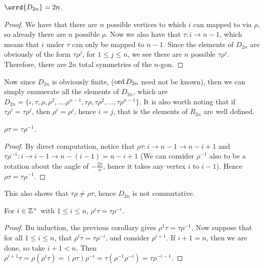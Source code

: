 \begin{corollary}
    $\orrd{D_{2n}}=2n$.
\end{corollary}
\begin{proof}
    We have that there are $n$ possible vertices to which  $i$ can mapped to via  $\rho$, so already
    there are  $n$ possible  $\rho$. Now we also have that  $\tau:i \rightarrow n-1$, which means
    that $i$ under $\tau$ can only be mapped to $n-1$. Since the elements of $D_{2n}$ are obviously
    of the form $\tau\rho^j$, for  $1 \leq j \leq n$, we see there are  $n$ possible  $\tau\rho^j$.
    Therefore, there are  $2n$ total symmetries of the  $n$-gon.
\end{proof}
\begin{remark}
    Now since $D_{2n}$ is obviously finite, ($\operatorname{ord}{D_{2n}}$ need not be known), then we can simply
    enumerate all the elements of $D_{2n}$, which are $D_{2n}=\{\iota, \tau, \rho, \rho^2, \dots.
    \rho^{n-1}, \tau\rho, \tau\rho^2, \dots, \tau\rho^{n-1}\}$. It is also worth noting that if
    $\tau\rho^i=\tau\rho^j$, then  $\rho^i=\rho^j$, hence  $i=j$, that is the elements of  $R_{2n}$
    are well defined.
\end{remark}
\begin{corollary}
    $\rho\tau=\tau\rho^{-1}$.		
\end{corollary}
\begin{proof}
    By direct computation, notice that $\rho\tau:i \rightarrow n-1 \rightarrow n-i+1$ and
    $\tau\rho^{-1}:i \rightarrow i-1 \rightarrow n-(i-1)=n-i+1$ (We can consider $\rho^{-1}$ also to
    be a rotation about the angle of $-\frac{2\pi}{n}$, hence it takes any vertex $i$ to  $i-1$).
    Hence $\rho\tau=\tau\rho^{-1}$.
\end{proof}
\begin{remark}
    This also shows that $\tau\rho \neq \rho\tau$, hence $D_{2n}$ is not commutative.
\end{remark}
\begin{corollary}
    For $i \in \mathbb{Z}^+$ with $1 \leq i \leq n$,  $\rho^i\tau=\tau\rho^{-i}$.
\end{corollary}
\begin{proof}
    Bu induction, the previous corollary gives $\rho^1\tau=\tau\rho^{-1}$. Now suppose that for all
    $1 \leq i \leq n$, that  $\rho^i\tau=\tau\rho^{-i}$, and consider $\rho^{i+1}$. If  $i+1=n$,
    then we are done, so take $i+1<n$. Then
    $\rho^{i+1}\tau=\rho(\rho^i\tau)=(\rho\tau)\rho^{-i}=\tau(\rho^{-1}\rho^{-i})=\tau\rho^{-i-1}$.
\end{proof}

